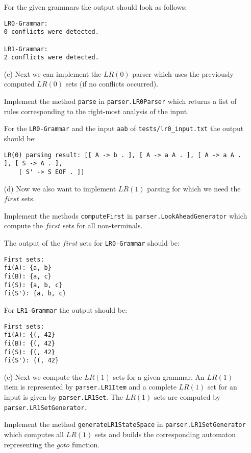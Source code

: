\documentclass[a4paper]{article}
\begin{document}
\begin{exercise}{20}
\begin{itemize}
    For the given grammars the output should look as follows:
    \begin{verbatim}
LR0-Grammar:
0 conflicts were detected.

LR1-Grammar:
2 conflicts were detected.
    \end{verbatim}

  \item[(c)] Next we can implement the $LR(0)$ parser which uses the previously computed $LR(0)$ sets (if no conflicts occurred).

    Implement the method \texttt{parse} in \texttt{parser.LR0Parser} which returns a list of rules corresponding to the right-most analysis of the input.

    For the \texttt{LR0-Grammar} and the input \texttt{aab} of \texttt{tests/lr0\_input.txt} the output should be:
    \begin{verbatim}
LR(0) parsing result: [[ A -> b . ], [ A -> a A . ], [ A -> a A . ], [ S -> A . ],
    [ S' -> S EOF . ]]
 \end{verbatim}

  \item[(d)] Now we also want to implement $LR(1)$ parsing for which we need the $first$ sets.

    Implement the methods \texttt{computeFirst} in  \texttt{parser.LookAheadGenerator} which compute the $first$ sets for all non-terminals.

    The output of the $first$ sets for \texttt{LR0-Grammar} should be:
    \begin{verbatim}
First sets:
fi(A): {a, b}
fi(B): {a, c}
fi(S): {a, b, c}
fi(S'): {a, b, c}
    \end{verbatim}

    For \texttt{LR1-Grammar} the output should be:
    \begin{verbatim}
First sets:
fi(A): {(, 42}
fi(B): {(, 42}
fi(S): {(, 42}
fi(S'): {(, 42}
    \end{verbatim}
    
    \item[(e)] Next we compute the $LR(1)$ sets for a given grammar. An $LR(1)$ item is represented by \texttt{parser.LR1Item} and a complete $LR(1)$ set for an input is given by \texttt{parser.LR1Set}. The $LR(1)$ sets are computed by \texttt{parser.LR1SetGenerator}.

    Implement the method \texttt{generateLR1StateSpace} in \texttt{parser.LR1SetGenerator} which computes all $LR(1)$ sets and builds the corresponding automaton representing the $goto$ function. 
    

\end{itemize}
\end{exercise}
\end{document}
